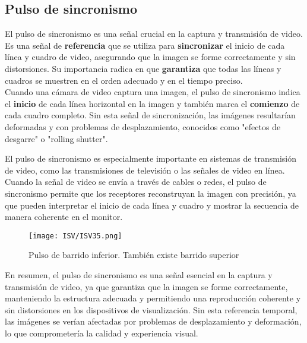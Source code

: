 \documentclass[
	12pt, %
	fleqn, %
	a4paper, %
	oneside, %
]{LegrandOrangeBook}
\begin{document}
\subsection{Pulso de sincronismo}
El pulso de sincronismo es una señal crucial en la captura y transmisión de video. Es una señal de \textbf{referencia} que se utiliza para \textbf{sincronizar} el inicio de cada línea y cuadro de video, asegurando que la imagen se forme correctamente y sin distorsiones. Su importancia radica en que \textbf{garantiza} que todas las líneas y cuadros se muestren en el orden adecuado y en el tiempo preciso.\\
Cuando una cámara de video captura una imagen, el pulso de sincronismo indica el \textbf{inicio} de cada línea horizontal en la imagen y también marca el \textbf{comienzo} de cada cuadro completo. Sin esta señal de sincronización, las imágenes resultarían deformadas y con problemas de desplazamiento, conocidos como "efectos de desgarre" o "rolling shutter".
\begin{center}
\end{center}
El pulso de sincronismo es especialmente importante en sistemas de transmisión de video, como las transmisiones de televisión o las señales de video en línea. Cuando la señal de video se envía a través de cables o redes, el pulso de sincronismo permite que los receptores reconstruyan la imagen con precisión, ya que pueden interpretar el inicio de cada línea y cuadro y mostrar la secuencia de manera coherente en el monitor.\\
\begin{figure}[H]
\centering
\texttt{[image: ISV/ISV35.png]}
\caption{Pulso de barrido inferior. También existe barrido superior}
\end{figure}
En resumen, el pulso de sincronismo es una señal esencial en la captura y transmisión de video, ya que garantiza que la imagen se forme correctamente, manteniendo la estructura adecuada y permitiendo una reproducción coherente y sin distorsiones en los dispositivos de visualización. Sin esta referencia temporal, las imágenes se verían afectadas por problemas de desplazamiento y deformación, lo que comprometería la calidad y experiencia visual.
\end{document}
